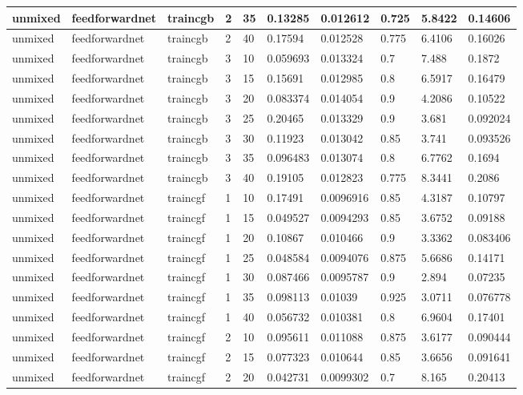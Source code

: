 \begin{longtable}{lllllllll}
unmixed & feedforwardnet & traincgb & 2 & 35 & 0.13285 & 0.012612 & 0.725 & 5.8422 & 0.14606 \\ \hline 
unmixed & feedforwardnet & traincgb & 2 & 40 & 0.17594 & 0.012528 & 0.775 & 6.4106 & 0.16026 \\ \hline 
unmixed & feedforwardnet & traincgb & 3 & 10 & 0.059693 & 0.013324 & 0.7 & 7.488 & 0.1872 \\ \hline 
unmixed & feedforwardnet & traincgb & 3 & 15 & 0.15691 & 0.012985 & 0.8 & 6.5917 & 0.16479 \\ \hline 
unmixed & feedforwardnet & traincgb & 3 & 20 & 0.083374 & 0.014054 & 0.9 & 4.2086 & 0.10522 \\ \hline 
unmixed & feedforwardnet & traincgb & 3 & 25 & 0.20465 & 0.013329 & 0.9 & 3.681 & 0.092024 \\ \hline 
unmixed & feedforwardnet & traincgb & 3 & 30 & 0.11923 & 0.013042 & 0.85 & 3.741 & 0.093526 \\ \hline 
unmixed & feedforwardnet & traincgb & 3 & 35 & 0.096483 & 0.013074 & 0.8 & 6.7762 & 0.1694 \\ \hline 
unmixed & feedforwardnet & traincgb & 3 & 40 & 0.19105 & 0.012823 & 0.775 & 8.3441 & 0.2086 \\ \hline 
unmixed & feedforwardnet & traincgf & 1 & 10 & 0.17491 & 0.0096916 & 0.85 & 4.3187 & 0.10797 \\ \hline 
unmixed & feedforwardnet & traincgf & 1 & 15 & 0.049527 & 0.0094293 & 0.85 & 3.6752 & 0.09188 \\ \hline 
unmixed & feedforwardnet & traincgf & 1 & 20 & 0.10867 & 0.010466 & 0.9 & 3.3362 & 0.083406 \\ \hline 
unmixed & feedforwardnet & traincgf & 1 & 25 & 0.048584 & 0.0094076 & 0.875 & 5.6686 & 0.14171 \\ \hline 
unmixed & feedforwardnet & traincgf & 1 & 30 & 0.087466 & 0.0095787 & 0.9 & 2.894 & 0.07235 \\ \hline 
unmixed & feedforwardnet & traincgf & 1 & 35 & 0.098113 & 0.01039 & 0.925 & 3.0711 & 0.076778 \\ \hline 
unmixed & feedforwardnet & traincgf & 1 & 40 & 0.056732 & 0.010381 & 0.8 & 6.9604 & 0.17401 \\ \hline 
unmixed & feedforwardnet & traincgf & 2 & 10 & 0.095611 & 0.011088 & 0.875 & 3.6177 & 0.090444 \\ \hline 
unmixed & feedforwardnet & traincgf & 2 & 15 & 0.077323 & 0.010644 & 0.85 & 3.6656 & 0.091641 \\ \hline 
unmixed & feedforwardnet & traincgf & 2 & 20 & 0.042731 & 0.0099302 & 0.7 & 8.165 & 0.20413 \\ \hline 

\end{longtable}
